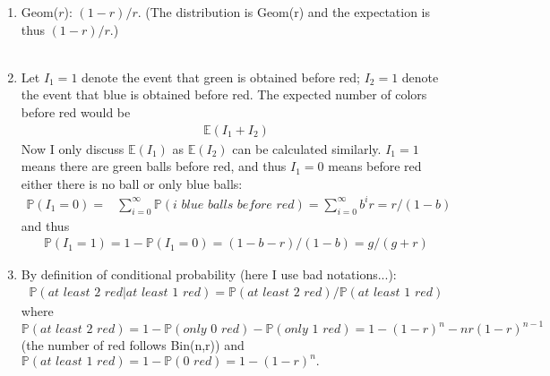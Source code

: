 
\setcounter{theorem}{56}
\begin{exercise} [BH.4.57]
\begin{solution}
    \begin{enumerate}
	    \item  Geom($r$): $(1-r)/r$. (The distribution is Geom(r) and the expectation is thus $(1-r)/r$.)\\~\\
        \item %
        Let $I_1=1$ denote the event that green is obtained before red; $I_2=1$ denote the event that blue is obtained before red. The expected number of colors before red would be 
        \begin{align*}
        	\mathbb{E} (I_1+I_2) 
        \end{align*}  
        Now I only discuss $\mathbb{E} (I_1) $ 
        as $\mathbb{E} (I_2) $ can be calculated similarly. $I_1=1$ means there are green balls before red, and thus $I_1=0$ means before red either there is no ball or only blue balls:
        \begin{align*}
        	\mathbb{P}\left(I_1=0 \right) =& \sum_{i=0}^\infty \mathbb{P}\left( \textit{i blue balls before red} \right) = \sum_{i=0}^\infty b^i r = r/(1-b) 
        \end{align*}
        and thus
        \begin{align*}
        	\mathbb{P}\left(I_1=1 \right) =1-	\mathbb{P}\left(I_1=0 \right) = (1-b-r)/(1-b) = g/(g+r) 
        \end{align*}
        \item %
        By definition of conditional probability (here I use bad notations...):
        \begin{align*}
        	\mathbb{P}(\textit{at least 2 red}| \textit{at least 1 red})=	\mathbb{P}(\textit{at least 2 red})/ \mathbb{P} (\textit{at least 1 red})
        \end{align*}
        where $\mathbb{P}(\textit{at least 2 red}) = 1-\mathbb{P}(\textit{only 0 red})-\mathbb{P}(\textit{only 1 red})=1-(1-r)^n -nr(1-r)^{n-1}$ (the number of red follows Bin(n,r)) and $\mathbb{P} (\textit{at least 1 red})=1- \mathbb{P} (\textit{0 red})=1-(1-r)^n.$ 
	\end{enumerate}
\end{solution}
\end{exercise}

